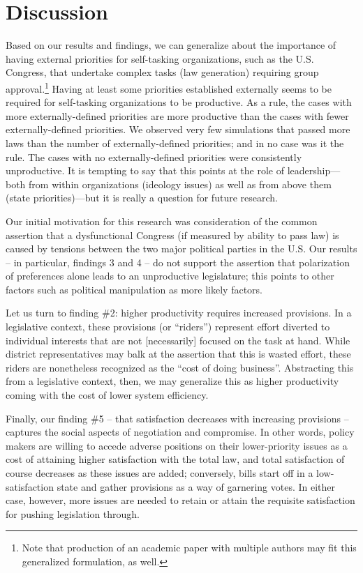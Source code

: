\documentclass[pdftex,12pt,oribibl]{llncs}
\begin{document}
\section{Discussion}
%
Based on our results and findings, we can generalize about the importance of having external priorities for self-tasking organizations, such as the U.S. Congress, that undertake complex tasks (law generation) requiring group approval.\footnote{Note that production of an academic paper with multiple authors may fit this generalized formulation, as well.}
Having at least some priorities established externally seems to be required for self-tasking organizations to be productive. 
As a rule, the cases with more externally-defined priorities are more productive than the cases with fewer externally-defined priorities. 
We observed very few simulations that passed more laws than the number of externally-defined priorities; and in no case was it the rule. 
The cases with no externally-defined priorities were consistently unproductive. 
It is tempting to say that this points at the role of leadership---both from within organizations (ideology issues) as well as from above them (state priorities)---but it is really a question for future research.

Our initial motivation for this research was consideration of the common assertion that a dysfunctional Congress (if measured by ability to pass law) is caused by tensions between the two major political parties in the U.S.
Our results -- in particular, findings 3 and 4 -- do not support the assertion that polarization of preferences alone leads to an unproductive legislature; this points to other factors such as political manipulation as more likely factors.

Let us turn to finding \#2: higher productivity requires increased provisions.
In a legislative context, these provisions (or ``riders'') represent effort diverted to individual interests that are not [necessarily] focused on the task at hand.
While district representatives may balk at the assertion that this is wasted effort, these riders are nonetheless recognized as the ``cost of doing business''.
Abstracting this from a legislative context, then, we may generalize this as higher productivity coming with the cost of lower system efficiency.

Finally, our finding \#5 -- that satisfaction decreases with increasing provisions -- captures the social aspects of negotiation and compromise.  
In other words, policy makers are willing to accede adverse positions on their lower-priority issues as a cost of attaining higher satisfaction with the total law, and total satisfaction of course decreases as these issues are added; conversely, bills start off in a low-satisfaction state and gather provisions as a way of garnering votes.  In either case, however, more issues are needed to retain or attain the requisite satisfaction for pushing legislation through.
\end{document}
